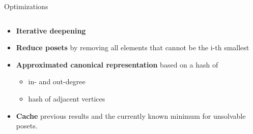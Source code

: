 \begin{frame}{Optimizations}
  \begin{columns}
    \begin{column}{0.6\textwidth}
      \begin{itemize}
        \item<1-> \textbf{Iterative deepening}
        \item<2-> \textbf{Reduce posets} by removing all elements that cannot be the i-th smallest
        \item<3-> \textbf{Approximated canonical representation} based on a hash of 
        \begin{itemize}
          \item in- and out-degree
          \item hash of adjacent vertices 
        \end{itemize}
        \item<4-> \textbf{Cache} previous results and the currently known minimum for unsolvable posets.
      \end{itemize}
    \end{column}

    \begin{column}{0.4\textwidth}
\end{column}
\end{columns}
\end{frame}

